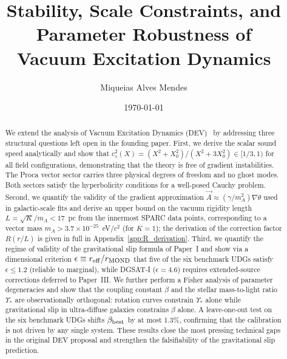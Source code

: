 \documentclass[aps,prd,reprint,floatfix,nofootinbib,superscriptaddress]{revtex4-2}
\newcommand{\Xzero}{X_0}
\newcommand{\cs}{c_s}
\begin{document}
\title{Stability, Scale Constraints, and Parameter Robustness of\\
       Vacuum Excitation Dynamics}

\author{Miqueias Alves Mendes}

\date{\today}

\begin{abstract}
We extend the analysis of Vacuum Excitation Dynamics (DEV)~\cite{Mendes2026}
by addressing three structural questions left open in the founding paper.
First, we derive the scalar sound speed analytically and show that
$\cs^2(X) = (X^2 + \Xzero^2)/(X^2 + 3\Xzero^2) \in [1/3,1)$ for all
field configurations, demonstrating that the theory is free of
gradient instabilities. The Proca vector sector carries three physical
degrees of freedom and no ghost modes. Both sectors satisfy the
hyperbolicity conditions for a well-posed Cauchy problem.
Second, we quantify the validity of the gradient approximation
$\vec{A}\approx(\gamma/m_A^2)\nabla\theta$ used in galactic-scale fits
and derive an upper bound on the vacuum rigidity length
$L = \sqrt{K}/m_A < 17$~pc from the innermost SPARC data points,
corresponding to a vector mass $m_A > 3.7\times10^{-25}$~eV/$c^2$
(for $K=1$); the derivation of the correction factor $R(r/L)$ is
given in full in Appendix~\ref{app:R_derivation}.
Third, we quantify the regime of validity of the gravitational slip
formula of Paper~I and show via a dimensional criterion
$\epsilon \equiv r_{\rm eff}/r_{\rm MOND}$ that five of the six
benchmark UDGs satisfy $\epsilon \leq 1.2$ (reliable to marginal),
while DGSAT-I ($\epsilon = 4.6$) requires extended-source corrections
deferred to Paper~III. We further perform a Fisher analysis of
parameter degeneracies and show that the coupling constant $\beta$
and the stellar mass-to-light ratio $\Upsilon_*$ are observationally
orthogonal: rotation curves constrain $\Upsilon_*$ alone while
gravitational slip in ultra-diffuse galaxies constrains $\beta$ alone.
A leave-one-out test on the six benchmark UDGs shifts $\beta_{\rm best}$
by at most 1.3\%, confirming that the calibration is not driven by
any single system. These results close the most pressing technical
gaps in the original DEV proposal and strengthen the falsifiability
of the gravitational slip prediction.
\end{abstract}

\maketitle
\end{document}
